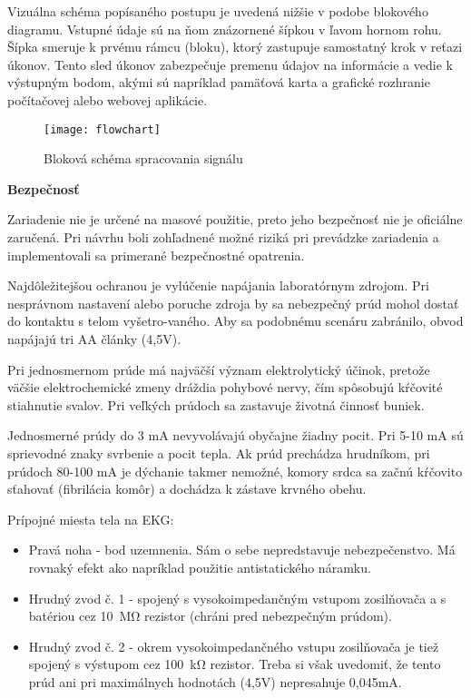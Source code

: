 \documentclass[titlepage,12pt]{article}
\begin{document}
Vizuálna schéma popísaného postupu je uvedená nižšie v podobe blokového diagramu. \linebreak Vstupné údaje sú na ňom znázornené šípkou v ľavom hornom rohu. Šípka smeruje k prvému rámcu (bloku), ktorý zastupuje samostatný krok v reťazi úkonov. Tento sled úkonov zabezpečuje premenu údajov na informácie a vedie k výstupným bodom, akými sú napríklad pamäťová karta a grafické rozhranie počítačovej alebo webovej aplikácie.


\newpage
\begin{figure}[!ht]
\begin{center}
\texttt{[image: flowchart]}
\caption{Bloková schéma spracovania signálu}
\end{center}
\end{figure}

\bigskip

\textbf{Bezpečnosť}

Zariadenie nie je určené na masové použitie, preto jeho bezpečnosť nie je oficiálne zaručená. Pri návrhu boli zohľadnené možné riziká pri prevádzke zariadenia a implementovali sa primerané bezpečnostné opatrenia. 

Najdôležitejšou ochranou je vylúčenie napájania laboratórnym zdrojom. Pri nesprávnom nastavení alebo poruche zdroja by sa nebezpečný prúd mohol dostať do kontaktu s telom vyšetro-vaného. Aby sa podobnému scenáru zabránilo, obvod napájajú tri AA články (4,5V). 

Pri jednosmernom prúde má najväčší význam elektrolytický účinok, pretože väčšie elektrochemické zmeny dráždia pohybové nervy, čím spôsobujú kŕčovité stiahnutie svalov. Pri veľkých prúdoch sa zastavuje životná činnosť buniek.

Jednosmerné prúdy do 3 mA nevyvolávajú obyčajne žiadny pocit. Pri 5-10 mA sú sprievodné znaky svrbenie a pocit tepla. Ak prúd prechádza hrudníkom, pri prúdoch 80-100 mA je dýchanie takmer nemožné, komory srdca sa začnú kŕčovito sťahovať (fibrilácia komôr) a dochádza \linebreak k zástave krvného obehu.

Prípojné miesta tela na EKG:
\begin{itemize}
	\item Pravá noha - bod uzemnenia. Sám o sebe nepredstavuje nebezpečenstvo. Má rovnaký efekt ako napríklad použitie antistatického náramku.
	\item Hrudný zvod č. 1 - spojený s vysokoimpedančným vstupom zosilňovača a s batériou cez \SI{10}{\mega\ohm} rezistor (chráni pred nebezpečným prúdom).
	\item Hrudný zvod č. 2 - okrem vysokoimpedančného vstupu zosilňovača je tiež spojený \linebreak s výstupom cez \SI{100}{\kilo\ohm} rezistor. Treba si však uvedomiť, že tento prúd ani pri maximálnych hodnotách (4,5V) nepresahuje 0,045mA.
\end{itemize}
\end{document}
